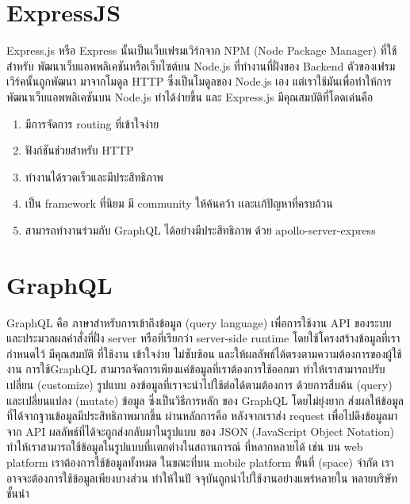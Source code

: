 \section{ExpressJS}
Express.js\cite{express} หรือ Express นั้นเป็นเว็บเฟรมเวิร์กจาก NPM (Node Package Manager) ที่ใช้สําหรับ
พัฒนาเว็บแอพพลิเคชันหรือเว็บไซต์บน Node.js ที่ทํางานที่ฝั่งของ Backend ตัวของเฟรมเวิร์คนั้นถูกพัฒนา
มาจากโมดูล HTTP ซึ่งเป็นโมดูลของ Node.js เอง แต่เราใช้มันเพื่อทําให้การพัฒนาเว็บแอพพลิเคชันบน
Node.js ทําได้ง่ายขึ้น และ Express.js มีคุณสมบัติที่โดดเด่นคือ
\begin{enumerate}
  \item มีการจัดการ routing ที่เข้าใจง่าย 
  \item ฟังก์ชันช่วยสําหรับ HTTP\cite{http}
  \item ทํางานได้รวดเร็วและมีประสิทธิภาพ
  \item เป็น framework ที่นิยม มี community ให้ค้นคว้า เเละเเก้ปัญหาที่ครบถ้วน
  \item สามารถทํางานร่วมกับ GraphQL ได้อย่างมีประสิทธิภาพ ด้วย apollo-server-express
\end{enumerate}

\section{GraphQL}
GraphQL\cite{graphql} คือ ภาษาสําหรับการเข้าถึงข้อมูล (query language) เพื่อการใช้งาน API ของระบบและประมวลผลคําสั่งที่ฝั่ง server หรือที่เรียกว่า server-side runtime 
โดยใช้โครงสร้างข้อมูลที่เรากําหนดไว้ มีคุณสมบัติ ที่ใช้งาน เข้าใจง่าย ไม่ซับซ้อน และให้ผลลัพธ์ได้ตรงตามความต้องการของผู้ใช้งาน 
การใช้GraphQL สามารถจัดการเพียงแค่ข้อมูลที่เราต้องการใช้ออกมา ทําให้เราสามารถปรับเปลี่ยน (customize) รูปแบบ
องข้อมูลที่เราจะนําไปใช้ต่อได้ตามต้องการ ด้วยการสืบค้น (query) และเปลี่ยนแปลง (mutate) ข้อมูล
ซึ่งเป็นวิธีการหลัก ของ GraphQL โดยไม่ยุ่งยาก ส่งผลให้ข้อมูลที่ได้จากฐานข้อมูลมีประสิทธิภาพมากขึ้น
ผ่านหลักการคือ หลังจากเราส่ง request เพื่อไปดึงข้อมูลมาจาก API ผลลัพธ์ที่ได้จะถูกส่งกลับมาในรูปแบบ
ของ JSON (JavaScript Object Notation) ทําให้เราสามารถใช้ข้อมูลในรูปแบบที่เเตกต่างในสถานการณ์
ที่หลากหลายได้ เช่น บน web platform เราต้องการใช้ข้อมูลทั้งหมด ในขณะที่บน mobile platform พื้นที่
(space) จํากัด เราอาจจะต้องการใช้ข้อมูลเพียงบางส่วน ทําให้ในปั จจุบันถูกนําไปใช้งานอย่างแพร่หลายใน
หลายบริษัทชั้นนํา

